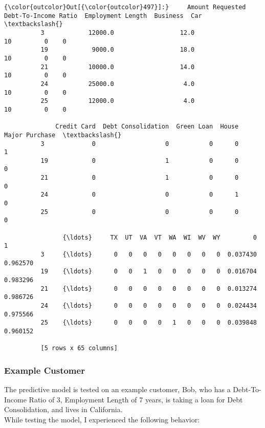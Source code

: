 \documentclass[11pt]{article}
\begin{document}
\begin{Verbatim}[commandchars=\\\{\}]
{\color{outcolor}Out[{\color{outcolor}497}]:}     Amount Requested  Debt-To-Income Ratio  Employment Length  Business  Car  \textbackslash{}
          3            12000.0                  12.0                 10         0    0   
          19            9000.0                  18.0                 10         0    0   
          21           10000.0                  14.0                 10         0    0   
          24           25000.0                   4.0                 10         0    0   
          25           12000.0                   4.0                 10         0    0   
          
              Credit Card  Debt Consolidation  Green Loan  House  Major Purchase  \textbackslash{}
          3             0                   0           0      0               1   
          19            0                   1           0      0               0   
          21            0                   1           0      0               0   
          24            0                   0           0      1               0   
          25            0                   0           0      0               0   
          
                {\ldots}     TX  UT  VA  VT  WA  WI  WV  WY         0         1  
          3     {\ldots}      0   0   0   0   0   0   0   0  0.037430  0.962570  
          19    {\ldots}      0   0   1   0   0   0   0   0  0.016704  0.983296  
          21    {\ldots}      0   0   0   0   0   0   0   0  0.013274  0.986726  
          24    {\ldots}      0   0   0   0   0   0   0   0  0.024434  0.975566  
          25    {\ldots}      0   0   0   0   1   0   0   0  0.039848  0.960152  
          
          [5 rows x 65 columns]
\end{Verbatim}
            \newpage
        \subsubsection{Example Customer}

The predictive model is tested on an example customer, Bob, who has a
Debt-To-Income Ratio of 3, Employment Length of 7 years, is taking a
loan for Debt Consolidation, and lives in California.\\

While testing the model, I experienced the following behavior:
\end{document}

